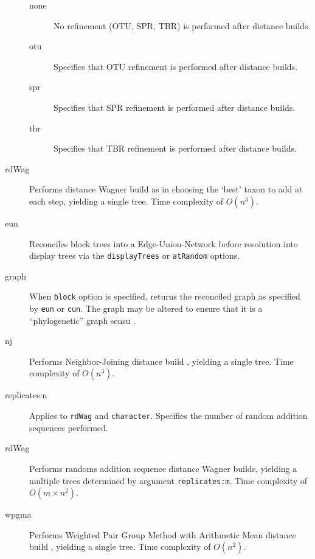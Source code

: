 \begin{description}
\begin{description}
			\item [none] No refinement (OTU, SPR, TBR) is performed after distance builds.
			
			\item [otu] Specifies that OTU refinement \citep{Wheeler2021} is performed after distance builds.	
			
			\item [spr] Specifies that SPR refinement \citep{Dayhoff1969} is performed after distance builds.

			\item [tbr] Specifies that TBR refinement \citep{Farris1988, swofford1990a} is performed after 
			distance builds.

			\end{description}
			
		\item [rdWag] Performs distance Wagner build as in \citep{Farris1972} choosing the `best' taxon to 
		add at each step, yielding a single tree. Time complexity of $O(n^3)$.
		
		\item [eun] Reconciles block trees into a Edge-Union-Network \citep{MiyagiandWheeler2019, 
		Wheeler2022} before resolution into display trees via the \texttt{displayTrees} or \texttt{atRandom} options.

		\item [graph] When \texttt{block} option is specified, returns the reconciled graph as specified by 
		\texttt{eun} or \texttt{cun}. The graph may be altered to ensure that it is a ``phylogenetic'' graph 
		sensu \cite{Moretetal2005}.
		
		\item [nj] Performs Neighbor-Joining distance build \citep{Saitou1987}, yielding a single tree. 
		Time complexity of $O(n^3)$.

		\item [replicates:n] Applies to \texttt{rdWag} and \texttt{character}. Specifies the number of 
		random addition sequences performed. 
		
		\item [rdWag] Performs randoms addition sequence distance Wagner builds, yielding a multiple 
		trees determined by argument \texttt{replicates:m}. Time complexity of $O(m \times n^2)$.

				
		\item [wpgma] Performs Weighted Pair Group Method with Arithmetic Mean distance build 
		\citep{SokalandMichener1958}, yielding a single tree. Time complexity of $O(n^2)$.
	
	\end{description}		

